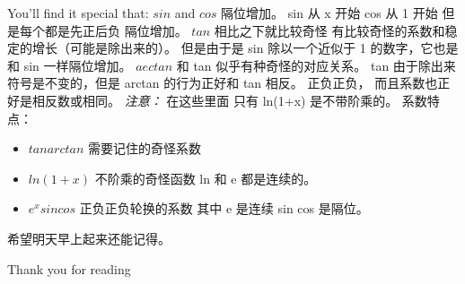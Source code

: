 \documentclass[10pt]{article}
\begin{document}
You'll find it special that: 
$sin$ and $cos$ 隔位增加。 sin 从 x 开始 cos 从 1 开始 但是每个都是先正后负 隔位增加。 
$tan$ 相比之下就比较奇怪 有比较奇怪的系数和稳定的增长（可能是除出来的）。 但是由于是 sin 除以一个近似于 1 的数字，它也是和 sin 一样隔位增加。 
$aectan$ 和 tan 似乎有种奇怪的对应关系。 tan 由于除出来符号是不变的，但是 arctan 的行为正好和 tan 相反。 正负正负， 而且系数也正好是相反数或相同。
\emph{注意： } 在这些里面 只有 ln(1+x) 是不带阶乘的。 系数特点：
\begin{itemize}
	\item $tan arctan$ 需要记住的奇怪系数
	\item $ln(1+x)$ 不阶乘的奇怪函数 ln 和 e 都是连续的。
	\item $e^{x} sin cos$ 正负正负轮换的系数 其中 e 是连续 sin cos 是隔位。
\end{itemize}
 希望明天早上起来还能记得。





 
 
 
 
 
 
 
 
\acknowledgements
Thank you for reading
 

 
\end{document}
